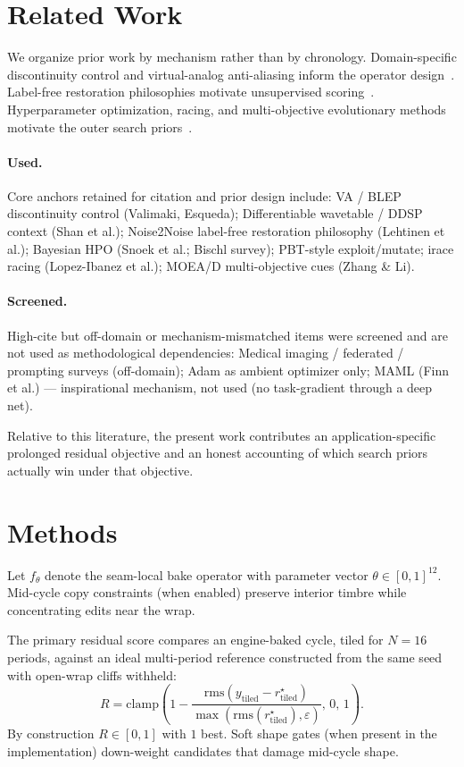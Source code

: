 \documentclass[11pt,a4paper]{article}
\begin{document}
\section{Related Work}
We organize prior work by mechanism rather than by chronology. Domain-specific discontinuity control and virtual-analog anti-aliasing inform the operator design~\cite{valimaki2006va,esqueda2016aliasing,esqueda2016blamp}. Label-free restoration philosophies motivate unsupervised scoring~\cite{shan2021dwt,lehtinen2018n2n}. Hyperparameter optimization, racing, and multi-objective evolutionary methods motivate the outer search priors~\cite{snoek2012bo,bischl2023hpo,lopez2016irace,zhang2007moead}.

\paragraph{Used.}

Core anchors retained for citation and prior design include: VA / BLEP discontinuity control (Valimaki, Esqueda); Differentiable wavetable / DDSP context (Shan et al.); Noise2Noise label-free restoration philosophy (Lehtinen et al.); Bayesian HPO (Snoek et al.; Bischl survey); PBT-style exploit/mutate; irace racing (Lopez-Ibanez et al.); MOEA/D multi-objective cues (Zhang \& Li).

\paragraph{Screened.}

High-cite but off-domain or mechanism-mismatched items were screened and are not used as methodological dependencies: Medical imaging / federated / prompting surveys (off-domain); Adam as ambient optimizer only; MAML (Finn et al.) --- inspirational mechanism, not used (no task-gradient through a deep net).

Relative to this literature, the present work contributes an application-specific prolonged residual objective and an honest accounting of which search priors actually win under that objective.

\section{Methods}
Let $f_\theta$ denote the seam-local bake operator with parameter vector $\theta\in[0,1]^{12}$. Mid-cycle copy constraints (when enabled) preserve interior timbre while concentrating edits near the wrap.

The primary residual score compares an engine-baked cycle, tiled for $N=16$ periods, against an ideal multi-period reference constructed from the same seed with open-wrap cliffs withheld:
\begin{equation}
R=\mathrm{clamp}\!\left(1-\frac{\mathrm{rms}(y_{\mathrm{tiled}}-r^{\star}_{\mathrm{tiled}})}{\max(\mathrm{rms}(r^{\star}_{\mathrm{tiled}}),\varepsilon)},\,0,\,1\right).
\end{equation}
By construction $R\in[0,1]$ with $1$ best. Soft shape gates (when present in the implementation) down-weight candidates that damage mid-cycle shape.
\end{document}
